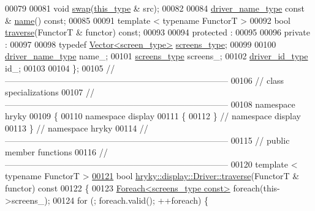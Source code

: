 \begin{DoxyCode}
00079 
00081     \textcolor{keywordtype}{void} \hyperlink{classhryky_1_1display_1_1_driver_a7e5660ca2ff8fe969e22465ed39a9541}{swap}(\hyperlink{classhryky_1_1display_1_1_driver}{this_type} & src);
00082 
00084     \hyperlink{classhryky_1_1_string}{driver_name_type} \textcolor{keyword}{const} & \hyperlink{classhryky_1_1display_1_1_driver_ad2ef4e4181112346aa57e4cc5fada687}{name}() \textcolor{keyword}{const};
00085 
00091     \textcolor{keyword}{template} < \textcolor{keyword}{typename} FunctorT >
00092     \textcolor{keywordtype}{bool} \hyperlink{classhryky_1_1display_1_1_driver_a8e93b23dbb530da6d47c1bf250066f91}{traverse}(FunctorT & functor) \textcolor{keyword}{const};
00093 
00094 \textcolor{keyword}{protected} :
00095 
00096 \textcolor{keyword}{private} :
00097 
00098     \textcolor{keyword}{typedef} \hyperlink{classhryky_1_1_vector}{Vector<screen_type>}     \hyperlink{classhryky_1_1_vector}{screens_type};
00099 
00100     \hyperlink{classhryky_1_1_string}{driver_name_type}    name\_;
00101     \hyperlink{classhryky_1_1_vector}{screens_type}        screens\_;
00102     \hyperlink{namespacehryky_1_1display_a438d20137cf00d71a4a72dfb7233ec90}{driver_id_type}      id\_;
00103 
00104 \};
00105 \textcolor{comment}{//
      ------------------------------------------------------------------------------}
00106 \textcolor{comment}{// class specializations}
00107 \textcolor{comment}{//
      ------------------------------------------------------------------------------}
00108 \textcolor{keyword}{namespace }hryky
00109 \{
00110 \textcolor{keyword}{namespace }display
00111 \{
00112 \} \textcolor{comment}{// namespace display}
00113 \} \textcolor{comment}{// namespace hryky}
00114 \textcolor{comment}{//
      ------------------------------------------------------------------------------}
00115 \textcolor{comment}{// public member functions}
00116 \textcolor{comment}{//
      ------------------------------------------------------------------------------}
00120 \textcolor{comment}{}\textcolor{keyword}{template} < \textcolor{keyword}{typename} FunctorT >
\hypertarget{display__driver_8h_source_l00121}{}\hyperlink{classhryky_1_1display_1_1_driver_a8e93b23dbb530da6d47c1bf250066f91}{00121} \textcolor{keywordtype}{bool} \hyperlink{classhryky_1_1display_1_1_driver_a8e93b23dbb530da6d47c1bf250066f91}{hryky::display::Driver::traverse}(FunctorT & functor)\textcolor{keyword}{ const}
00122 \textcolor{keyword}{}\{
00123     \hyperlink{classhryky_1_1_foreach}{Foreach<screens_type const>} \textcolor{keywordflow}{foreach}(this->screens\_);
00124     \textcolor{keywordflow}{for} (; \textcolor{keywordflow}{foreach}.valid(); ++\textcolor{keywordflow}{foreach}) \{

\end{DoxyCode}
